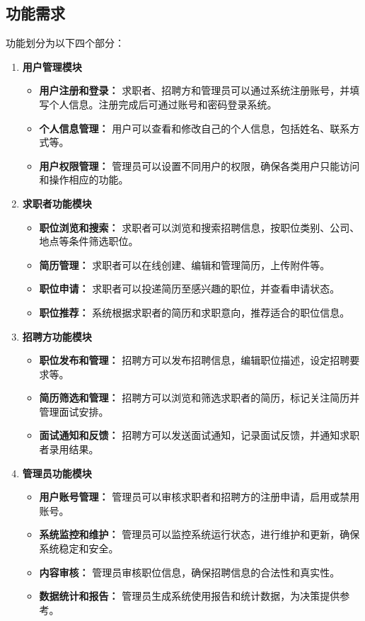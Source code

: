 \documentclass[UTF8,a4paper,10pt]{ctexart}
\begin{document}
\subsection{功能需求}
功能划分为以下四个部分：
\begin{enumerate}
    \item \textbf{用户管理模块}
    \begin{itemize}
        \item \textbf{用户注册和登录：} 求职者、招聘方和管理员可以通过系统注册账号，并填写个人信息。注册完成后可通过账号和密码登录系统。
        \item \textbf{个人信息管理：} 用户可以查看和修改自己的个人信息，包括姓名、联系方式等。
        \item \textbf{用户权限管理：} 管理员可以设置不同用户的权限，确保各类用户只能访问和操作相应的功能。
    \end{itemize}
    
    \item \textbf{求职者功能模块}
    \begin{itemize}
        \item \textbf{职位浏览和搜索：} 求职者可以浏览和搜索招聘信息，按职位类别、公司、地点等条件筛选职位。
        \item \textbf{简历管理：} 求职者可以在线创建、编辑和管理简历，上传附件等。
        \item \textbf{职位申请：} 求职者可以投递简历至感兴趣的职位，并查看申请状态。
        \item \textbf{职位推荐：} 系统根据求职者的简历和求职意向，推荐适合的职位信息。
    \end{itemize}
    
    \item \textbf{招聘方功能模块}
    \begin{itemize}
        \item \textbf{职位发布和管理：} 招聘方可以发布招聘信息，编辑职位描述，设定招聘要求等。
        \item \textbf{简历筛选和管理：} 招聘方可以浏览和筛选求职者的简历，标记关注简历并管理面试安排。
        \item \textbf{面试通知和反馈：} 招聘方可以发送面试通知，记录面试反馈，并通知求职者录用结果。
    \end{itemize}
    
    \item \textbf{管理员功能模块}
    \begin{itemize}
        \item \textbf{用户账号管理：} 管理员可以审核求职者和招聘方的注册申请，启用或禁用账号。
        \item \textbf{系统监控和维护：} 管理员可以监控系统运行状态，进行维护和更新，确保系统稳定和安全。
        \item \textbf{内容审核：} 管理员审核职位信息，确保招聘信息的合法性和真实性。
        \item \textbf{数据统计和报告：} 管理员生成系统使用报告和统计数据，为决策提供参考。
    \end{itemize}
\end{enumerate}
\end{document}
